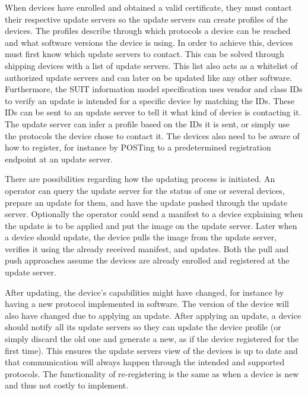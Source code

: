 \documentclass[0-thesis.tex]{subfiles}
\begin{document}
When devices have enrolled and obtained a valid certificate, they must contact their
respective update servers so the update servers can create profiles of the devices. The
profiles describe through which protocols a device can be reached and what software
versions the device is using. In order to achieve this, devices must first know which
update servers to contact. This can be solved through shipping devices with a list of
update servers. This list also acts as a whitelist of authorized update servers and can
later on be updated like any other software. Furthermore, the SUIT information model
specification uses vendor and class IDs to verify an update is intended for a specific
device by matching the IDs. These IDs can be sent to an update server to tell it what kind
of device is contacting it. The update server can infer a profile based on the IDs it is
sent, or simply use the protocols the device chose to contact it. The devices also need to
be aware of how to register, for instance by POSTing to a predetermined registration
endpoint at an update server. 

There are possibilities regarding how the updating process is initiated. An operator can
query the update server for the status of one or several devices, prepare an update for
them, and have the update pushed through the update server. Optionally the operator could
send a manifest to a device explaining when the update is to be applied and put the
image on the update server. Later when a device should update, the device pulls the
image from the update server, verifies it using the already received manifest, and
updates. Both the pull and push approaches assume the devices are already enrolled and
registered at the update server.

After updating, the device's capabilities might have changed, for instance by having a new
protocol implemented in software. The version of the device will also have changed due to
applying an update. After applying an update, a device should notify all its update
servers so they can update the device profile (or simply discard the old one and generate
a new, as if the device registered for the first time). This ensures the update servers
view of the devices is up to date and that communication will always happen through the
intended and supported protocols. The functionality of re-registering is the same as when
a device is new and thus not costly to implement.
\end{document}
